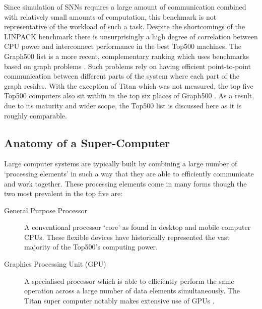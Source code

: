 		Since simulation of SNNs requires a large amount of communication combined
		with relatively small amounts of computation, this benchmark is not
		representative of the workload of such a task. Despite the shortcomings of
		the LINPACK benchmark there is unsurprisingly a high degree of correlation
		between CPU power and interconnect performance in the best Top500 machines.
		The Graph500 list is a more recent, complementary ranking which uses
		benchmarks based on graph problems \cite{murphy10}. Such problems rely on
		having efficient point-to-point communication between different parts of the
		system where each part of the graph resides. With the exception of Titan
		which was not measured, the top five Top500 computers also sit within in the
		top six places of Graph500 \cite{murphy13}. As a result, due to its maturity
		and wider scope, the Top500 list is discussed here as it is roughly
		comparable.
		
		\subsection{Anatomy of a Super-Computer}
			
			
			Large computer systems are typically built by combining a large number of
			`processing elements' in such a way that they are able to efficiently
			communicate and work together. These processing elements come in many
			forms though the two most prevalent in the top five are:
			
			\begin{description}
				
				\item[General Purpose Processor] A conventional processor `core' as
				found in desktop and mobile computer CPUs. These flexible devices have
				historically represented the vast majority of the Top500's computing
				power.
				
				\item[Graphics Processing Unit (GPU)] A specialised processor which is
				able to efficiently perform the same operation across a large number of
				data elements simultaneously. The Titan super computer notably makes
				extensive use of GPUs \cite{bland12}.
				
			\end{description}
			
